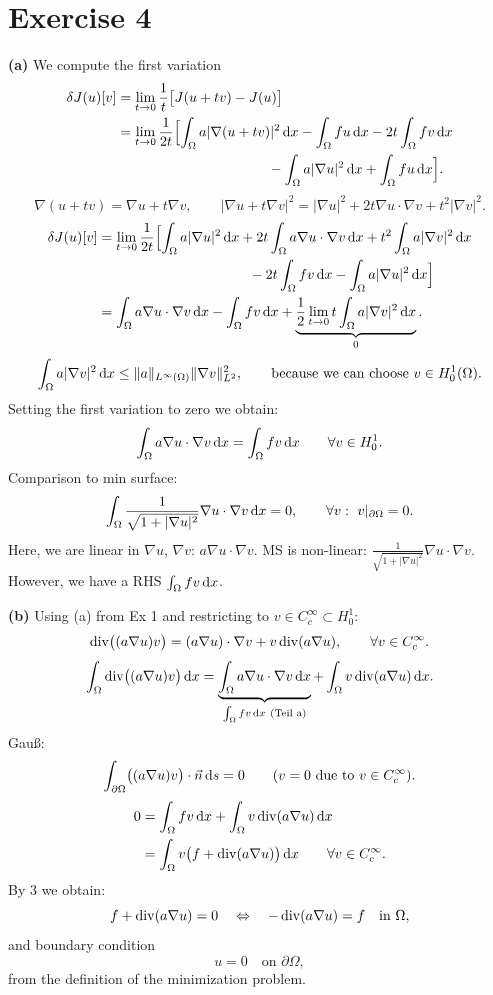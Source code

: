 ﻿\documentclass[11pt,a4paper]{article}
\begin{document}
\section*{Exercise 4}
\textbf{(a)} We compute the first variation
\begin{align*}
\delta J(u)[v]
&=\lim_{t\to0}\frac1t\bigl[J(u+tv)-J(u)\bigr]\\
&=\lim_{t\to0}\frac1{2t}\Bigl[
\int_\Omega a|\nabla(u+tv)|^2\dx
-\int_\Omega fu\dx-2t\int_\Omega fv\dx\\
&\hspace{38mm}-\int_\Omega a|\nabla u|^2\dx+\int_\Omega fu\dx\Bigr].
\end{align*}
\[
\nabla(u+tv)=\nabla u+t\nabla v,\qquad
|\nabla u+t\nabla v|^2
=|\nabla u|^2+2t\nabla u\cdot\nabla v+t^2|\nabla v|^2.
\]
\begin{align*}
\delta J(u)[v]
&=\lim_{t\to0}\frac1{2t}\Bigl[
\int_\Omega a|\nabla u|^2\dx+2t\int_\Omega a\nabla u\cdot\nabla v\dx
+t^2\int_\Omega a|\nabla v|^2\dx\\
&\hspace{38mm}-2t\int_\Omega fv\dx-\int_\Omega a|\nabla u|^2\dx\Bigr]\\
&=\int_\Omega a\nabla u\cdot\nabla v\dx-\int_\Omega fv\dx
+\underbrace{\frac12\lim_{t\to0}t\int_\Omega a|\nabla v|^2\dx}_{0}.
\end{align*}
\[
\int_\Omega a|\nabla v|^2\,\mathrm{d}x
\le\|a\|_{L^\infty(\Omega)}\|\nabla v\|_{L^2}^2,
\qquad\text{because we can choose }v\in H_0^1(\Omega).
\]
Setting the first variation to zero we obtain:
\[
\int_\Omega a\nabla u\cdot\nabla v\,\mathrm{d}x=\int_\Omega fv\,\mathrm{d}x
\qquad\forall v\in H_0^1.
\]
Comparison to min surface:
\[
\int_\Omega\frac1{\sqrt{1+|\nabla u|^2}}\nabla u\cdot\nabla v\,\mathrm{d}x=0,
\qquad\forall v:\ v|_{\partial\Omega}=0.
\]
Here, we are linear in $\nabla u$, $\nabla v$: $a\nabla u\cdot\nabla v$.
MS is non-linear: $\frac1{\sqrt{1+|\nabla u|^2}}\nabla u\cdot\nabla v$.
However, we have a RHS $\int_\Omega fv\,\mathrm{d}x$.

\textbf{(b)} Using (a) from Ex 1 and restricting to
$v\in C_c^\infty\subset H_0^1$:
\[
\operatorname{div}\bigl((a\nabla u)v\bigr)
=(a\nabla u)\cdot\nabla v+v\operatorname{div}(a\nabla u),\qquad\forall v\in C_c^\infty.
\]
\[
\int_\Omega\Div\bigl((a\nabla u)v\bigr)\dx
=\underbrace{\int_\Omega a\nabla u\cdot\nabla v\dx}_{\int_\Omega fv\dx\ \text{(Teil a)}}
+\int_\Omega v\Div(a\nabla u)\dx.
\]
Gau\ss:
\[
\int_{\partial\Omega}\bigl((a\nabla u)v\bigr)\cdot\vec n\,\mathrm{d}s=0
\qquad\text{($v=0$ due to $v\in C_c^\infty$)}.
\]
\begin{align*}
0&=\int_\Omega fv\,\mathrm{d}x+\int_\Omega v\operatorname{div}(a\nabla u)\,\mathrm{d}x\\
&=\int_\Omega v\bigl(f+\operatorname{div}(a\nabla u)\bigr)\,\mathrm{d}x
\qquad\forall v\in C_c^\infty.
\end{align*}
By 3 we obtain:
\[
f+\operatorname{div}(a\nabla u)=0\quad\Leftrightarrow\quad-\operatorname{div}(a\nabla u)=f
\quad\text{in }\Omega,
\]
and boundary condition
\[
u=0\quad\text{on }\partial\Omega,
\]
from the definition of the minimization problem.
\end{document}

